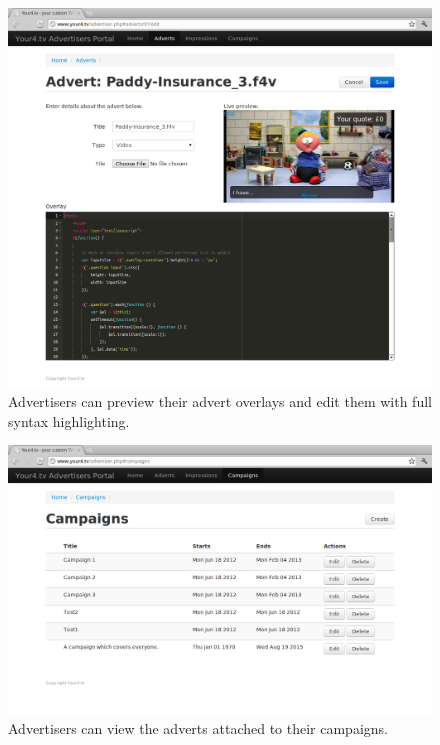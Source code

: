 \begin{figure}[th]
	\centering
	\includegraphics[width=\textwidth,height=0.5\textheight,keepaspectratio]{images/screenshots/advertiser-advert-edit.png}
	\caption{Advertisers can preview their advert overlays and edit them with full syntax highlighting.}
	\label{fig:advertiser-advert-edit}
\end{figure}
\begin{figure}[th]
	\centering
	\includegraphics[width=\textwidth,height=0.5\textheight,keepaspectratio]{images/screenshots/advertiser-campaigns.png}
	\caption{Advertisers can view the adverts attached to their campaigns.}
	\label{fig:advertiser-campaigns}
\end{figure}
